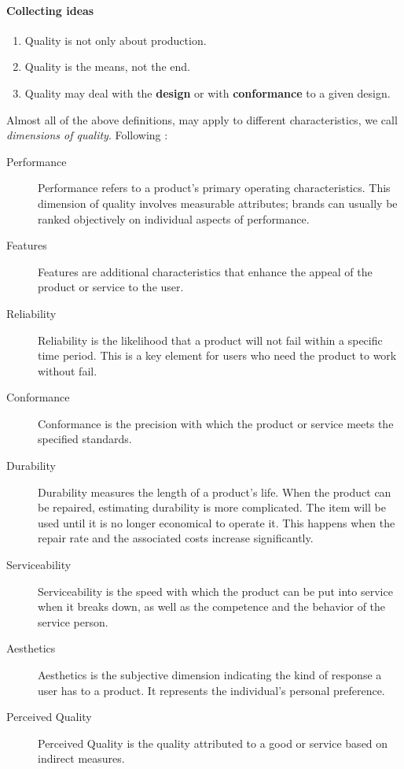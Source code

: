 \documentclass[12pt,a4paper]{report}
\theoremstyle{plain}
\theoremstyle{definition}
\begin{document}
\begin{tcolorbox}[breakable]
\paragraph{Collecting ideas}
\begin{enumerate}
\item Quality is not only about production. 
\item Quality is the means, not the end.
\item Quality may deal with the \textbf{design} or with \textbf{conformance} to a given design. 
\end{enumerate}
\end{tcolorbox}


Almost all of the above definitions, may apply to different characteristics, we call \emph{dimensions of quality}. Following \cite{wikipedia_eight_2015} :
\begin{description}
\item [Performance] Performance refers to a product's primary operating characteristics. This dimension of quality involves measurable attributes; brands can usually be ranked objectively on individual aspects of performance.
\item [{Features}] Features are additional characteristics that enhance the appeal of the product or service to the user.
\item [{Reliability}] Reliability is the likelihood that a product will not fail within a specific time period. This is a key element for users who need the product to work without fail.
\item [{Conformance}] Conformance is the precision with which the product or service meets the specified standards.
\item [{Durability}] Durability measures the length of a product’s life. When the product can be repaired, estimating durability is more complicated. The item will be used until it is no longer economical to operate it. This happens when the repair rate and the associated costs increase significantly.
\item [{Serviceability}] Serviceability is the speed with which the product can be put into service when it breaks down, as well as the competence and the behavior of the service person.
\item [{Aesthetics}] Aesthetics is the subjective dimension indicating the kind of response a user has to a product. It represents the individual’s personal preference.
\item [{Perceived Quality}] Perceived Quality is the quality attributed to a good or service based on indirect measures.
\end{description}
\end{document}
